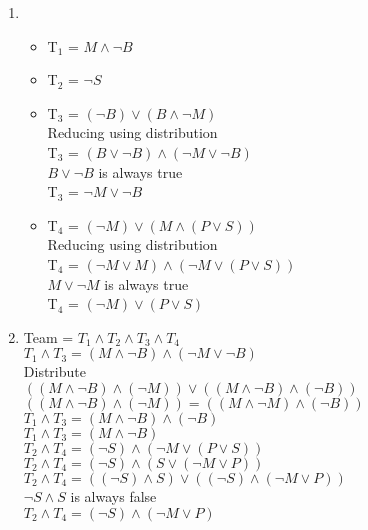 \documentclass[11pt]{amsart}
\begin{document}
	\begin{sol}
		\begin{enumerate}
			\item
			\begin{itemize}
				\item T$_1$ = $M \wedge \neg B$
				
				\item T$_2$ = $\neg S$
				
				\item T$_3$ = $(\neg B) \vee (B \wedge \neg M)$\\
				Reducing using distribution\\
				T$_3$ = $(B \vee \neg B) \wedge (\neg M \vee \neg B)$\\
				$B \vee \neg B$ is always true\\
				T$_3$ = $\neg M \vee \neg B$
				
				\item T$_4$ = $(\neg M) \vee (M \wedge (P \vee S))$\\
				Reducing using distribution\\
				T$_4$ = $(\neg M \vee M) \wedge (\neg M \vee (P \vee S))$\\
				$M \vee \neg M$ is always true\\
				T$_4$ = $(\neg M) \vee (P \vee S)$
			\end{itemize}

			\item Team = $T_1 \wedge T_2 \wedge T_3 \wedge T_4$\\

			$T_1 \wedge T_3 = (M \wedge \neg B) \wedge (\neg M \vee \neg B)$\\
			Distribute\\
			$((M \wedge \neg B) \wedge (\neg M)) \vee ((M \wedge \neg B) \wedge (\neg B))$\\
			$((M \wedge \neg B) \wedge (\neg M)) = ((M \wedge \neg M) \wedge (\neg B))$\\
			$T_1 \wedge T_3 = (M \wedge \neg B) \wedge (\neg B)$\\
			$T_1 \wedge T_3 = (M \wedge \neg B)$\\

			$T_2 \wedge T_4 = (\neg S) \wedge (\neg M \vee (P \vee S))$\\
			$T_2 \wedge T_4 = (\neg S) \wedge (S \vee (\neg M \vee P))$\\
			$T_2 \wedge T_4 = ((\neg S) \wedge S) \vee ((\neg S) \wedge (\neg M \vee P))$\\
			$\neg S \wedge S$ is always false\\
			$T_2 \wedge T_4 = (\neg S) \wedge (\neg M \vee P)$\\


\end{enumerate}
\end{sol}
\end{document}
